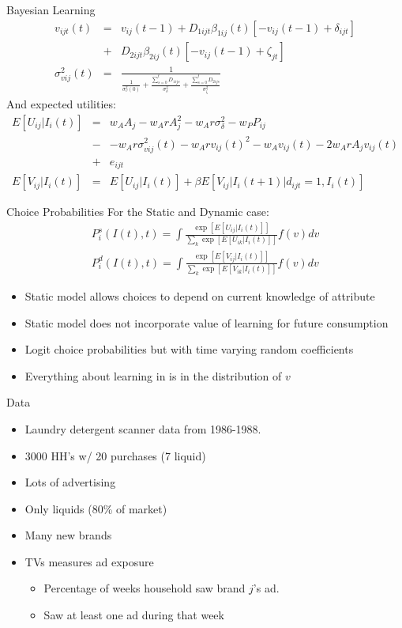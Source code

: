 \documentclass[xcolor=pdftex,dvipsnames,table,mathserif]{beamer}
\begin{document}
\begin{frame}{Bayesian Learning}
\begin{eqnarray*}
v_{ijt}(t) &=& v_{ij}(t-1) + D_{1ijt} \beta_{1ij}(t)[-v_{ij}(t-1) + \delta_{ijt}]  \\
&+& D_{2ijt} \beta_{2ij}(t)[-v_{ij}(t-1) + \zeta_{jt}]\\
\sigma_{vij}^2(t) &=& \frac{1}{\frac{1}{\sigma_v^2(0)} + \frac{\sum_{s=0}^t D_{1ijs}}{\sigma_{\delta}^2} + \frac{\sum_{s=0}^t D_{2ijs}}{\sigma_{\zeta}^2}}
\end{eqnarray*}
And expected utilities:
\begin{eqnarray*}
E[U_{ij} | I_i(t)] &=& w_A A_j - w_A r A_j^2 -w_A r \sigma_{\delta}^2 -w_P P_{ij} \\
&-& -w_A r \sigma_{vij}^2(t) - w_A r v_{ij}(t)^2  - w_A v_{ij}(t) - 2w_A r A_j v_{ij} (t) \\ &+& e_{ijt}\\
E[V_{ij} | I_i(t)] &=& E[U_{ij} | I_i(t)] + \beta E[V_{ij} | I_i(t+1) | d_{ijt} =1, I_i(t)]
\end{eqnarray*}
\end{frame}


\begin{frame}{Choice Probabilities}
For the Static and Dynamic case:
\begin{eqnarray*}
P^s_i(I(t),t) = \int \frac{\exp [E [U_{ij} | I_i(t)] ] } {\sum_k \exp [E [U_{ik} | I_i(t)] ] } f(v) dv\\
P^d_i(I(t),t) = \int \frac{\exp [E [V_{ij} | I_i(t)] ] } {\sum_k \exp [E [V_{ik} | I_i(t)] ] } f(v) dv
\end{eqnarray*}
\begin{itemize}
\item Static model allows choices to depend on 
\alert{current knowledge of attribute}
\item Static model does not incorporate \alert{value of learning for future consumption}
\item Logit choice probabilities but with time varying random coefficients
\item Everything about learning in is in the distribution of $v$
\end{itemize}
\end{frame}


\begin{frame}{Data}
\begin{itemize}
\item Laundry detergent scanner data from 1986-1988.
\item 3000 HH's w/ 20 purchases (7 liquid)
\item Lots of advertising
\item Only liquids (80\% of market)
\item Many new brands
\item  TVs measures ad exposure
\begin{itemize}
\item Percentage of weeks household saw brand $j$'s ad.
\item Saw at least one ad during that week
\end{itemize}
\end{itemize}
\end{frame}
\end{document}
